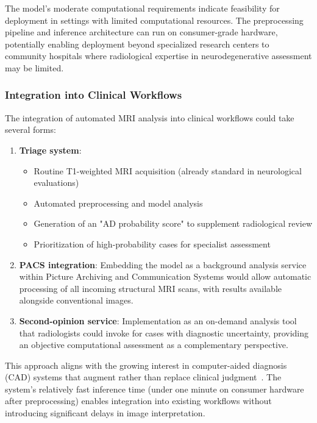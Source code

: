 \documentclass[12pt, a4paper]{article}
\begin{document}
The model's moderate computational requirements indicate feasibility for deployment in settings with limited computational resources. The preprocessing pipeline and inference architecture can run on consumer-grade hardware, potentially enabling deployment beyond specialized research centers to community hospitals where radiological expertise in neurodegenerative assessment may be limited.

\subsubsection{Integration into Clinical Workflows}

The integration of automated MRI analysis into clinical workflows could take several forms:

\begin{enumerate}
    \item \textbf{Triage system}: 
    \begin{itemize}
        \item Routine T1-weighted MRI acquisition (already standard in neurological evaluations)
        \item Automated preprocessing and model analysis
        \item Generation of an "AD probability score" to supplement radiological review
        \item Prioritization of high-probability cases for specialist assessment
    \end{itemize}
    
    \item \textbf{PACS integration}: Embedding the model as a background analysis service within Picture Archiving and Communication Systems would allow automatic processing of all incoming structural MRI scans, with results available alongside conventional images.
    
    \item \textbf{Second-opinion service}: Implementation as an on-demand analysis tool that radiologists could invoke for cases with diagnostic uncertainty, providing an objective computational assessment as a complementary perspective.
\end{enumerate}

This approach aligns with the growing interest in computer-aided diagnosis (CAD) systems that augment rather than replace clinical judgment~\cite{kloppel2008accuracy}. The system's relatively fast inference time (under one minute on consumer hardware after preprocessing) enables integration into existing workflows without introducing significant delays in image interpretation.
\end{document}
